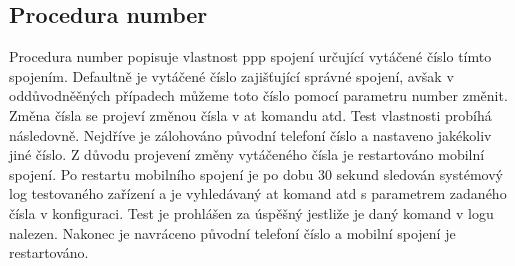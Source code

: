 \subsection{Procedura number}
Procedura number popisuje vlastnost ppp spojení určující vytáčené číslo tímto spojením. Defaultně je vytáčené číslo zajišťující správné spojení, avšak v oddůvodněěných případech můžeme toto číslo pomocí parametru number změnit. Změna čísla se projeví změnou čísla v at komandu atd. Test vlastnosti probíhá následovně. Nejdříve je zálohováno původní telefoní číslo a nastaveno jakékoliv jiné číslo. Z důvodu projevení změny vytáčeného čísla je restartováno mobilní spojení. Po restartu mobilního spojení je po dobu 30 sekund sledován systémový log testovaného zařízení a je vyhledávaný at komand atd s parametrem zadaného čísla v konfiguraci. Test je prohlášen za úspěšný jestliže je daný komand v logu nalezen. Nakonec je navráceno původní telefoní číslo a mobilní spojení je restartováno.


\endinput
